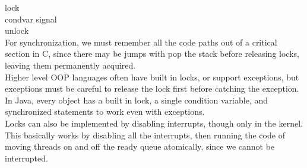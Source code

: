 \documentclass[paper=a4, fontsize=11pt]{scrartcl} %
\numberwithin{equation}{section} %
\numberwithin{figure}{section} %
\numberwithin{table}{section} %
\begin{document}
lock\\
condvar signal\\
unlock\\
For synchronization, we must remember all the code paths out of a critical section in C, since there may be jumps with pop the stack before releasing locks, leaving them permanently acquired. \\
Higher level OOP languages often have built in locks, or support exceptions, but exceptions must be careful to release the lock first before catching the exception. \\
In Java, every object has a built in lock, a single condition variable, and synchronized statements to work even with exceptions. \\
Locks can also be implemented by disabling interrupts, though only in the kernel. \\
This basically works by disabling all the interrupts, then running the code of moving threads on and off the ready queue atomically, since we cannot be interrupted. \\
\end{document}

